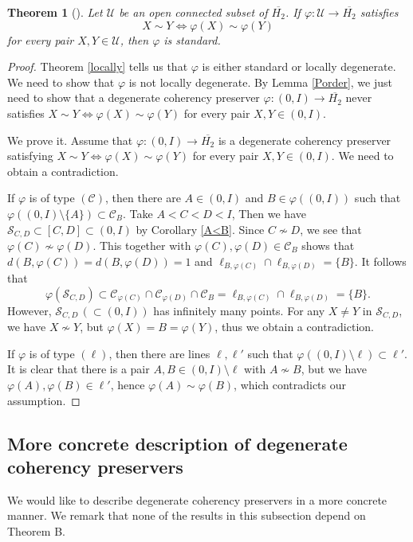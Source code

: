 \documentclass[10pt]{amsart}
\newtheorem{theorem}{Theorem}[section]
\theoremstyle{definition}
\theoremstyle{remark}
\numberwithin{subsection}{section}
\numberwithin{equation}{section}
\newcommand\cC{{\mathcal{C}}}
\newcommand\oH{{\overline{H_2}}}
\begin{document}
\begin{theorem}[{\cite{Les}}]\label{June}
Let $\mathcal{U}$ be an open connected subset of $\oH$. 
If $\varphi\colon \mathcal{U}\to \oH$ satisfies 
\[
X\sim Y\iff \varphi(X)\sim \varphi(Y)
\] 
for every pair $X, Y\in \mathcal{U}$, then $\varphi$ is standard.
\end{theorem}
\begin{proof}
Theorem \ref{locally} tells us that $\varphi$ is either standard or locally degenerate. 
We need to show that $\varphi$ is not locally degenerate. 
By Lemma \ref{Porder}, we just need to show that a degenerate coherency preserver $\varphi\colon (0, I)\to \oH$ never satisfies $X\sim Y\iff \varphi(X)\sim \varphi(Y)$ for every pair $X, Y\in (0, I)$. 

We prove it. 
Assume that $\varphi\colon (0, I)\to \oH$ is a degenerate coherency preserver satisfying $X\sim Y\iff \varphi(X)\sim \varphi(Y)$ for every pair $X, Y\in (0, I)$. We need to obtain a contradiction.

If $\varphi$ is of type $(\cC)$, then there are $A\in (0,I)$ and $B\in \varphi((0,I))$ such that $\varphi((0,I)\setminus\{A\})\subset \cC_B$. 
Take $A<C<D<I$, Then we have $\mathcal{S}_{C,D}\subset [C,D]\subset (0,I)$ by Corollary \ref{A<B}. 
Since $C\not\sim D$, we see that $\varphi(C)\not\sim \varphi(D)$. 
This together with $\varphi(C),\varphi(D)\in \cC_B$ shows that $d(B, \varphi(C))=d(B,\varphi(D))=1$ and $\ell_{B, \varphi(C)}\cap \ell_{B,\varphi(D)}=\{B\}$.
It follows that 
\[
\varphi(\mathcal{S}_{C,D})\subset \cC_{\varphi(C)}\cap \cC_{\varphi(D)}\cap \cC_{B} =\ell_{B, \varphi(C)}\cap \ell_{B,\varphi(D)}=\{B\}.
\]
However, $\mathcal{S}_{C,D}\,(\subset (0,I))$ has infinitely many points. 
For any $X\neq Y$ in $\mathcal{S}_{C,D}$, we have $X\not\sim Y$, but $\varphi(X)=B=\varphi(Y)$, thus we obtain a contradiction. 

If $\varphi$ is of type $(\ell)$, then there are lines $\ell,\ell'$  such that $\varphi((0,I)\setminus\ell)\subset \ell'$.
It is clear that there is a pair $A,B\in (0,I)\setminus\ell$ with $A\not\sim B$, but we have $\varphi(A),\varphi(B)\in \ell'$, hence $\varphi(A)\sim \varphi(B)$, which contradicts our assumption.
\end{proof}


\subsection{More concrete description of degenerate coherency preservers}\label{concrete}
We would like to describe degenerate coherency preservers in a more concrete manner.
We remark that none of the results in this subsection depend on Theorem B.
\end{document}
